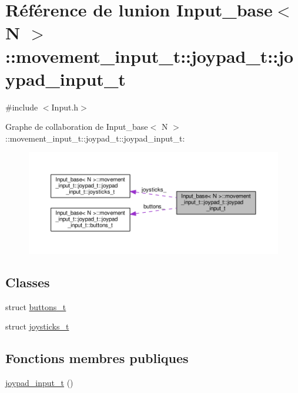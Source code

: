 \hypertarget{union_input__base_1_1movement__input__t_1_1joypad__t_1_1joypad__input__t}{}\section{Référence de l\textquotesingle{}union Input\+\_\+base$<$ N $>$\+:\+:movement\+\_\+input\+\_\+t\+:\+:joypad\+\_\+t\+:\+:joypad\+\_\+input\+\_\+t}
\label{union_input__base_1_1movement__input__t_1_1joypad__t_1_1joypad__input__t}


{\ttfamily \#include $<$Input.\+h$>$}



Graphe de collaboration de Input\+\_\+base$<$ N $>$\+:\+:movement\+\_\+input\+\_\+t\+:\+:joypad\+\_\+t\+:\+:joypad\+\_\+input\+\_\+t\+:\nopagebreak
\begin{figure}[H]
\begin{center}
\leavevmode
\includegraphics[width=350pt]{union_input__base_1_1movement__input__t_1_1joypad__t_1_1joypad__input__t__coll__graph}
\end{center}
\end{figure}
\subsection*{Classes}
\begin{DoxyCompactItemize}
\item 
struct \hyperlink{struct_input__base_1_1movement__input__t_1_1joypad__t_1_1joypad__input__t_1_1buttons__t}{buttons\+\_\+t}
\item 
struct \hyperlink{struct_input__base_1_1movement__input__t_1_1joypad__t_1_1joypad__input__t_1_1joysticks__t}{joysticks\+\_\+t}
\end{DoxyCompactItemize}
\subsection*{Fonctions membres publiques}
\begin{DoxyCompactItemize}
\item 
\hyperlink{union_input__base_1_1movement__input__t_1_1joypad__t_1_1joypad__input__t_aecc82d9f657e0b3b88040f690d62df30}{joypad\+\_\+input\+\_\+t} ()
\end{DoxyCompactItemize}
